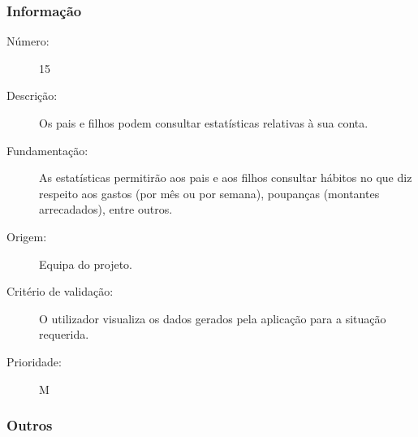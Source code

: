 \documentclass[12pt,a4paper]{article}
\begin{document}
    \subsubsection{Informação}

      \begin{description}
        \item[Número:]15
        \item[Descrição:]Os pais e filhos podem consultar estatísticas relativas à sua conta.
        \item[Fundamentação:]As estatísticas permitirão aos pais e aos filhos consultar hábitos no que diz respeito aos gastos (por mês ou por semana), poupanças (montantes arrecadados), entre outros.
        \item[Origem:]Equipa do projeto.
        \item[Critério de validação:] O utilizador visualiza os dados gerados pela aplicação para a situação requerida.
        \item[Prioridade:]M
      \end{description}

    \subsubsection{Outros}
\end{document}
